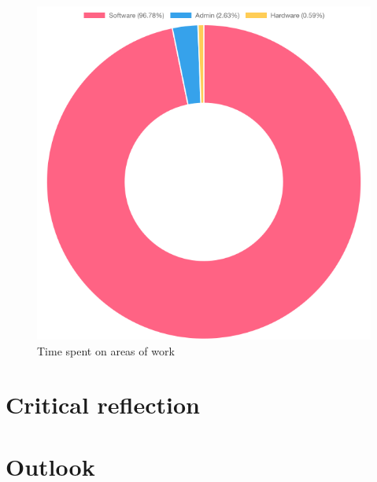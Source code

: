 \begin{figure}[h]
\centering
\includegraphics[scale=0.5]{04_Artefakte/01_Abbildungen/time-spent-on-types-of-work}
\caption[Time spent on areas of work]{Time spent on areas of work\protect}
\label{fig:timeSpentTypeOfWork}
\end{figure}

\section{Critical reflection}

\section{Outlook}
